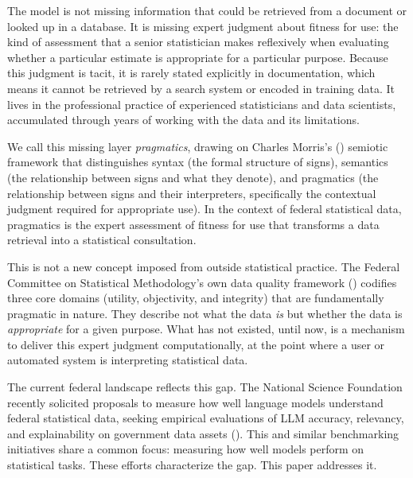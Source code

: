 \documentclass[
  11pt,
  letterpaper,
]{article}
\begin{document}
The model is not missing information that could be retrieved from a
document or looked up in a database. It is missing expert judgment about
fitness for use: the kind of assessment that a senior statistician makes
reflexively when evaluating whether a particular estimate is appropriate
for a particular purpose. Because this judgment is tacit, it is rarely
stated explicitly in documentation, which means it cannot be retrieved
by a search system or encoded in training data. It lives in the
professional practice of experienced statisticians and data scientists,
accumulated through years of working with the data and its limitations.

We call this missing layer \emph{pragmatics}, drawing on Charles
Morris's () semiotic framework that
distinguishes syntax (the formal structure of signs), semantics (the
relationship between signs and what they denote), and pragmatics (the
relationship between signs and their interpreters, specifically the
contextual judgment required for appropriate use). In the context of
federal statistical data, pragmatics is the expert assessment of fitness
for use that transforms a data retrieval into a statistical
consultation.

This is not a new concept imposed from outside statistical practice. The
Federal Committee on Statistical Methodology's own data quality
framework () codifies three core domains (utility, objectivity,
and integrity) that are fundamentally pragmatic in nature. They describe
not what the data \emph{is} but whether the data is \emph{appropriate}
for a given purpose. What has not existed, until now, is a mechanism to
deliver this expert judgment computationally, at the point where a user
or automated system is interpreting statistical data.

The current federal landscape reflects this gap. The National Science
Foundation recently solicited proposals to measure how well language
models understand federal statistical data, seeking empirical
evaluations of LLM accuracy, relevancy, and explainability on government
data assets (). This and similar benchmarking
initiatives share a common focus: measuring how well models perform on
statistical tasks. These efforts characterize the gap. This paper
addresses it.
\end{document}
